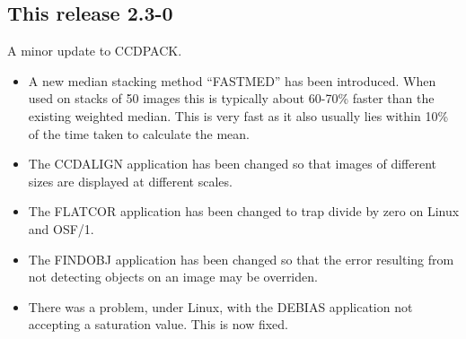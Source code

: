 \documentclass[twoside,11pt]{article}
\newcommand{\htmlref}[2]{#1}
\renewcommand{\_}{\texttt{\symbol{95}}}
\newcommand{\xroutine}[1]{\htmlref{{\sc #1}}{#1}}
\begin{document}
\subsection{This release 2.3-0}
A minor update to CCDPACK.
\begin{itemize}
  \item A new median stacking method ``FASTMED'' has been introduced. When
  used on stacks of 50 images this is typically about 60-70\% faster
  than the existing weighted median. This is very fast as it also
  usually lies within 10\% of the time taken to calculate the mean.

\item  The \xroutine{CCDALIGN} application has been changed so that images of
  different sizes are displayed at different scales.

\item  The \xroutine{FLATCOR} application has been changed to trap 
  divide by zero on Linux and OSF/1.

\item  The \xroutine{FINDOBJ} application has been changed so that the
  error resulting from not detecting objects on an image may be
  overriden. 

\item There was a problem, under Linux, with the \xroutine{DEBIAS} 
      application not accepting a saturation value. This is now fixed.
\end{itemize}
\end{document}
